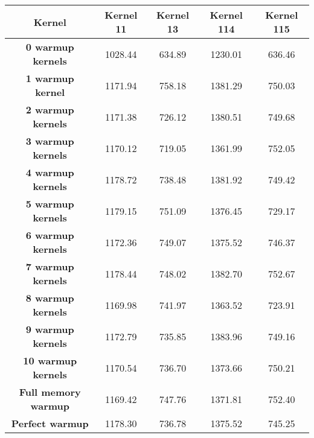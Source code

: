 \begin{tabular}{ |c|c|c|c|c |}
    \hline
    \textbf{Kernel} & Kernel 11 & Kernel 13 & Kernel 114 & Kernel 115 \\
    \hline
    \hline
    \textbf{0 warmup kernels} & 1028.44 & 634.89 & 1230.01 & 636.46 \\
    \textbf{1 warmup kernel} & 1171.94 & 758.18 & 1381.29 & 750.03 \\
    \textbf{2 warmup kernels} & 1171.38 & 726.12 & 1380.51 & 749.68 \\
    \textbf{3 warmup kernels} & 1170.12 & 719.05 & 1361.99 & 752.05 \\
    \textbf{4 warmup kernels} & 1178.72 & 738.48 & 1381.92 & 749.42 \\
    \textbf{5 warmup kernels} & 1179.15 & 751.09 & 1376.45 & 729.17 \\
    \textbf{6 warmup kernels} & 1172.36 & 749.07 & 1375.52 & 746.37 \\
    \textbf{7 warmup kernels} & 1178.44 & 748.02 & 1382.70 & 752.67 \\
    \textbf{8 warmup kernels} & 1169.98 & 741.97 & 1363.52 & 723.91 \\
    \textbf{9 warmup kernels} & 1172.79 & 735.85 & 1383.96 & 749.16 \\
    \textbf{10 warmup kernels} & 1170.54 & 736.70 & 1373.66 & 750.21 \\
    \textbf{Full memory warmup} & 1169.42 & 747.76 & 1371.81 & 752.40 \\
    \textbf{Perfect warmup} & 1178.30 & 736.78 & 1375.52 & 745.25 \\
    \hline
\end{tabular}